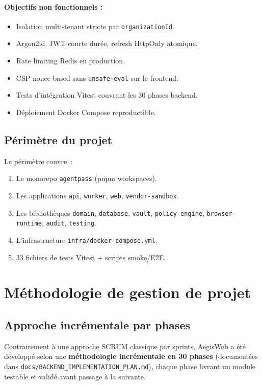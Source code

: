 \paragraph{Objectifs non fonctionnels :}
\begin{itemize}[leftmargin=1.8cm, itemsep=3pt]
  \item Isolation multi-tenant stricte par \texttt{organizationId}.
  \item Argon2id, JWT courte durée, refresh HttpOnly atomique.
  \item Rate limiting Redis en production.
  \item CSP nonce-based sans \texttt{unsafe-eval} sur le frontend.
  \item Tests d'intégration Vitest couvrant les 30 phases backend.
  \item Déploiement Docker Compose reproductible.
\end{itemize}

\subsection{Périmètre du projet}

Le périmètre couvre~:
\begin{enumerate}[leftmargin=1.8cm, itemsep=3pt]
  \item Le monorepo \texttt{agentpass} (pnpm workspaces).
  \item Les applications \texttt{api}, \texttt{worker}, \texttt{web},
    \texttt{vendor-sandbox}.
  \item Les bibliothèques \texttt{domain}, \texttt{database}, \texttt{vault},
    \texttt{policy-engine}, \texttt{browser-runtime}, \texttt{audit},
    \texttt{testing}.
  \item L'infrastructure \texttt{infra/docker-compose.yml}.
  \item 33 fichiers de tests Vitest + scripts smoke/E2E.
\end{enumerate}

\section{Méthodologie de gestion de projet}

\subsection{Approche incrémentale par phases}

Contrairement à une approche SCRUM classique par sprints, AegisWeb a été
développé selon une \textbf{méthodologie incrémentale en 30 phases}
(documentées dans \texttt{docs/BACKEND\_IMPLEMENTATION\_PLAN.md}), chaque
phase livrant un module testable et validé avant passage à la suivante.


